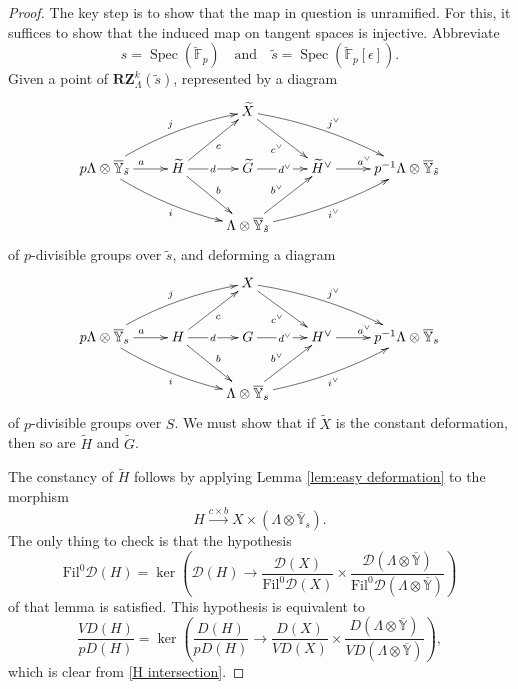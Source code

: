 \documentclass[11pt]{alggeom}
\newcommand{\map}[1]{\xrightarrow{#1}}
\newcommand{\F}{\mathbb F}
\DeclareMathOperator{\Spec}{Spec}
\begin{document}
\begin{proof}
The key step is to show that the map in question is unramified.  For this, it suffices to show that the induced map on tangent spaces is injective.
Abbreviate 
\[
s = \Spec(\breve{\F}_p)  \quad\mbox{and}\quad  \tilde{s}= \Spec(\breve{\F}_p[\epsilon]).
\]
Given a point of $\mathbf{RZ}^k_\Lambda( \tilde{s} )$, represented by a diagram 
\[
\xymatrix{
& &   { \widetilde{X}  } \ar[dr]_{c^\vee}  \ar@/^/[drr]^{j^\vee} \\
{p\Lambda \otimes \overline{\mathbb{Y}}_{ \tilde{s}}  }\ar[r]^a  \ar@/^/[urr]^j   \ar@/_/[drr]_i  &  { \widetilde{H} }  \ar[ur]_c \ar[dr]^b  \ar[r]|{\, d\, }  &  {\widetilde{G}}  \ar[r] | {\, d^\vee\, } & {  \widetilde{H}^\vee }  \ar[r]^{a^\vee}  & {p^{-1}\Lambda \otimes  \overline{\mathbb{Y}}_{ \tilde{s}}  } \\
& &  { \Lambda \otimes  \overline{\mathbb{Y} }_{ \tilde{s}} } \ar[ur]^{b^\vee} \ar@/_/[urr]_{i^\vee}
}
\]
of $p$-divisible groups over $ \tilde{s}$,  and deforming  a diagram 
\[
\xymatrix{
& &   {  X  } \ar[dr]_{c^\vee}  \ar@/^/[drr]^{j^\vee} \\
{p\Lambda \otimes \overline{\mathbb{Y}}_s  }\ar[r]^a  \ar@/^/[urr]^j   \ar@/_/[drr]_i  &  { H }  \ar[ur]_c \ar[dr]^b  \ar[r]|{\, d\, }  &  {G}  \ar[r] | {\, d^\vee\, } & {  H^{ \vee} }  \ar[r]^{a^\vee}  & {p^{-1}\Lambda \otimes  \overline{\mathbb{Y}}_s  } \\
& &  { \Lambda \otimes  \overline{\mathbb{Y} }_s } \ar[ur]^{b^\vee} \ar@/_/[urr]_{i^\vee}
}
\]
of $p$-divisible groups over $S$.  We must show that if $\widetilde{X}$ is the constant deformation,  then so are $\widetilde{H}$ and $\widetilde{G}$.


The constancy of  $\widetilde{H}$ follows by applying Lemma \ref{lem:easy deformation}  to the morphism
\[
H \map{c\times b}  X  \times (\Lambda \otimes \overline{\mathbb{Y}}_s). 
\]
The only thing to check is that the hypothesis 
\[
\mathrm{Fil}^0 \mathscr{D} (H)
=\ker \left( 
 \mathscr{D} (H)   \to  \frac{ \mathscr{D}(X)  } {  \mathrm{Fil}^0 \mathscr{D}(X)   }
    \times \frac{    \mathscr{D}( \Lambda \otimes \overline{\mathbb{Y}} )  }{  \mathrm{Fil}^0     \mathscr{D}( \Lambda \otimes \overline{\mathbb{Y}} ) }  \right) 
\]
of that lemma is satisfied.  This hypothesis  is equivalent  to 
\[
\frac{VD(H)}{pD(H)} = 
\ker\left(  
\frac{D(H)}{pD(H)} \to
 \frac{D(X)}{VD(X)} \times \frac{D(\Lambda \otimes  \overline{\mathbb{Y}})  }{ V D(\Lambda \otimes  \overline{\mathbb{Y}}) } 
\right) ,
\]
which is clear from \eqref{H intersection}.  





\end{proof}
\end{document}
